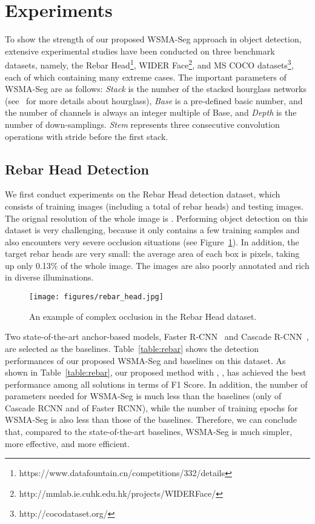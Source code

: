 \documentclass{article}
\begin{document}
\section{Experiments}

To show the strength of our proposed WSMA-Seg approach in object detection, extensive experimental studies have been conducted on three benchmark datasets, namely, the Rebar Head\footnote{https://www.datafountain.cn/competitions/332/details}, WIDER Face\footnote{http://mmlab.ie.cuhk.edu.hk/projects/WIDERFace/}, and MS COCO datasets\footnote{http://cocodataset.org/}, each of which containing many extreme cases. The important parameters of WSMA-Seg are as follows: \textit{Stack} is the number of the stacked hourglass networks (see~\cite{newell2016stacked} for more details about hourglass), \textit{Base} is a pre-defined basic number, and the number of channels is always an integer  multiple of Base, and \textit{Depth} is the number of down-samplings. \textit{Stem} represents three consecutive  convolution operations with stride  before the first stack.

\subsection{Rebar Head Detection}



We first conduct experiments on the Rebar Head detection dataset, which consists of  training images (including a total of  rebar heads) and  testing images. The orignal resolution of the whole image is . Performing object detection on this dataset is very challenging, because it only contains a few training samples  and also encounters very severe occlusion situations (see Figure~\ref{fig:rebar_example}). In addition, the target rebar heads are very small: the average area of each box is  pixels, taking up only 0.13\% of the whole image. The images are also poorly annotated and rich in diverse illuminations. 


\begin{figure}[!t]
  \centering
  \texttt{[image: figures/rebar\_head.jpg]}
  \caption{An example of complex occlusion in the Rebar Head dataset.\label{fig:rebar_example}}
\end{figure}

Two state-of-the-art anchor-based models, Faster R-CNN~\cite{ren2015fasterrcnn} and Cascade R-CNN~\cite{cai2018cascade}, are selected as the baselines. Table~\ref{table:rebar} shows the detection performances of our proposed WSMA-Seg and baselines on this dataset.
As shown in Table~\ref{table:rebar}, our proposed method with , ,  has achieved the best performance among all solutions in terms of F1 Score. In addition, the number of parameters needed for WSMA-Seg is much less than the baselines (only  of Cascade RCNN and  of Faster RCNN), while the number of training epochs for WSMA-Seg is also less than those of the baselines. Therefore, we can conclude that, compared to the state-of-the-art baselines, WSMA-Seg is much simpler, more effective, and more efficient.
\end{document}
